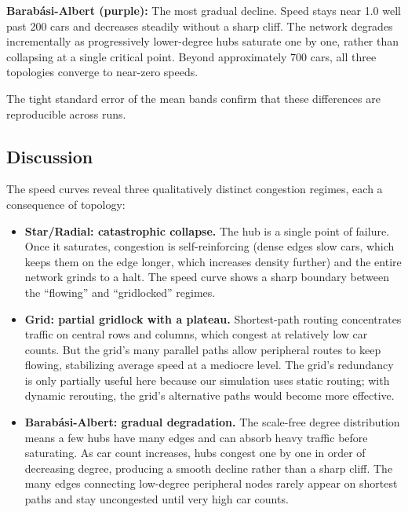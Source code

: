 \documentclass[12pt]{article}
\begin{document}
\vspace{0.5em}
\textbf{Barab\'{a}si-Albert (purple):} The most gradual decline. Speed stays near 1.0 well past 200 cars and decreases steadily without a sharp cliff. The network degrades incrementally as progressively lower-degree hubs saturate one by one, rather than collapsing at a single critical point. Beyond approximately 700 cars, all three topologies converge to near-zero speeds.

The tight standard error of the mean bands confirm that these differences are reproducible across runs.

\vspace{0.5em}
\subsection{Discussion}

The speed curves reveal three qualitatively distinct congestion regimes, each a consequence of topology:

\begin{itemize}
    \item \textbf{Star/Radial: catastrophic collapse.} The hub is a single point of failure. Once it saturates, congestion is self-reinforcing (dense edges slow cars, which keeps them on the edge longer, which increases density further) and the entire network grinds to a halt. The speed curve shows a sharp boundary between the ``flowing'' and ``gridlocked'' regimes.
    \item \textbf{Grid: partial gridlock with a plateau.} Shortest-path routing concentrates traffic on central rows and columns, which congest at relatively low car counts. But the grid's many parallel paths allow peripheral routes to keep flowing, stabilizing average speed at a mediocre level. The grid's redundancy is only partially useful here because our simulation uses static routing; with dynamic rerouting, the grid's alternative paths would become more effective.
    \item \textbf{Barab\'{a}si-Albert: gradual degradation.} The scale-free degree distribution means a few hubs have many edges and can absorb heavy traffic before saturating. As car count increases, hubs congest one by one in order of decreasing degree, producing a smooth decline rather than a sharp cliff. The many edges connecting low-degree peripheral nodes rarely appear on shortest paths and stay uncongested until very high car counts.
\end{itemize}
\end{document}
